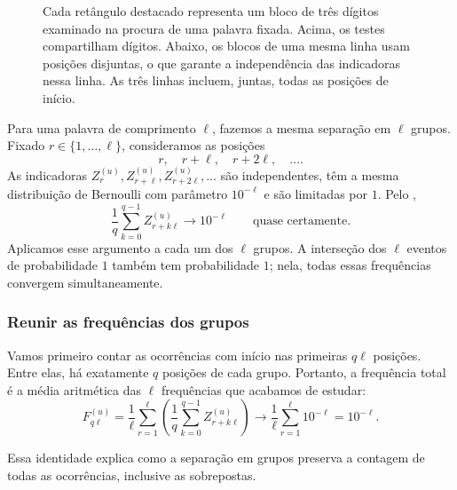 \documentclass[12pt,portuguese]{article}
\theoremstyle{definition}
\theoremstyle{plainexercise}
\theoremstyle{starredexercise}
\theoremstyle{definition}
\begin{document}
\begin{figure}[H]
\caption{Cada retângulo destacado representa um bloco de três dígitos
examinado na procura de uma palavra fixada. Acima, os testes compartilham
dígitos. Abaixo, os blocos de uma mesma linha usam posições disjuntas,
o que garante a independência das indicadoras nessa linha. As três linhas
incluem, juntas, todas as posições de início.}
\label{fig:blocos-normais}
\end{figure}

Para uma palavra de comprimento $\ell$, fazemos a mesma separação em
$\ell$ grupos. Fixado $r\in\{1,\ldots,\ell\}$, consideramos as posições
\[
r,\quad r+\ell,\quad r+2\ell,\quad\ldots.
\]
As indicadoras $Z_r^{(u)},Z_{r+\ell}^{(u)},Z_{r+2\ell}^{(u)},\ldots$ são
independentes, têm a mesma distribuição de Bernoulli com parâmetro
$10^{-\ell}$ e são limitadas por $1$. Pelo ,
\[
\frac{1}{q}\sum_{k=0}^{q-1}Z_{r+k\ell}^{(u)}
\longrightarrow10^{-\ell}
\qquad\text{quase certamente.}
\]
Aplicamos esse argumento a cada um dos $\ell$ grupos. A interseção dos
$\ell$ eventos de probabilidade $1$ também tem probabilidade $1$; nela,
todas essas frequências convergem simultaneamente.

\subsubsection{Reunir as frequências dos grupos}

\begin{samepage}
Vamos primeiro contar as ocorrências com início nas primeiras $q\ell$
posições. Entre elas, há exatamente $q$ posições de cada grupo. Portanto,
a frequência total é a média aritmética das $\ell$ frequências que acabamos
de estudar:
\[
F_{q\ell}^{(u)}
=\frac{1}{\ell}\sum_{r=1}^{\ell}
\left(\frac{1}{q}\sum_{k=0}^{q-1}Z_{r+k\ell}^{(u)}\right)
\longrightarrow
\frac{1}{\ell}\sum_{r=1}^{\ell}10^{-\ell}
=10^{-\ell}.
\]
\end{samepage}
Essa identidade explica como a separação em grupos preserva a contagem de
todas as ocorrências, inclusive as sobrepostas.
\end{document}
